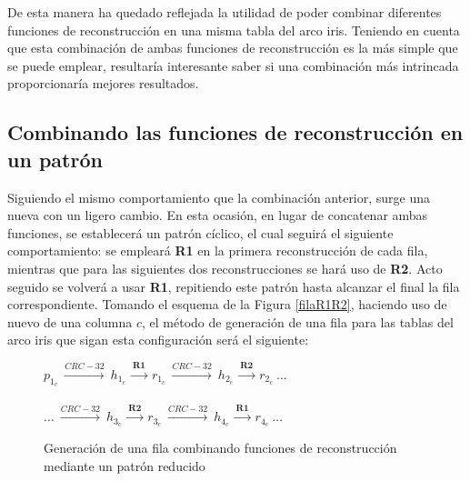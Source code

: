 \documentclass[12pt,spanish,listoffigures,listoftables,listofalgorithms]{tfgetsinf}
\begin{document}
De esta manera ha quedado reflejada la utilidad de poder combinar diferentes funciones de reconstrucción en una misma tabla del arco iris. Teniendo en cuenta que esta combinación de ambas funciones de reconstrucción es la más simple que se puede emplear, resultaría interesante saber si una combinación más intrincada proporcionaría mejores resultados.

\subsection{Combinando las funciones de reconstrucción en un patrón}

Siguiendo el mismo comportamiento que la combinación anterior, surge una nueva con un ligero cambio. En esta ocasión, en lugar de concatenar ambas funciones, se establecerá un patrón cíclico, el cual seguirá el siguiente comportamiento: se empleará \textbf{R1} en la primera reconstrucción de cada fila, mientras que para las siguientes dos reconstrucciones se hará uso de \textbf{R2}. Acto seguido se volverá a usar \textbf{R1}, repitiendo este patrón hasta alcanzar el final la fila correspondiente. Tomando el esquema de la Figura \ref{filaR1R2}, haciendo uso de nuevo de una columna $c$, el método de generación de una fila para las tablas del arco iris que sigan esta configuración será el siguiente:

\begin{figure}[H]
	
	\centering

	$p_{1_c}~ \xrightarrow{CRC-32}~ h_{1_c}~ \xrightarrow{\textbf{R1}}~ r_{1_c}~ \xrightarrow{CRC-32}~ h_{2_c}~ \xrightarrow{\textbf{R2}}~ r_{2_c}~ \dots$ \\
	~\\
	$\dots~\xrightarrow{CRC-32}~ h_{3_c}~ \xrightarrow{\textbf{R2}}~ r_{3_c}~\xrightarrow{CRC-32}~ h_{4_c}~ \xrightarrow{\textbf{R1}}~ r_{4_c}~\dots$

	\caption{Generación de una fila combinando funciones de reconstrucción mediante un patrón reducido}
	\label{filapp}

\end{figure}
\end{document}
